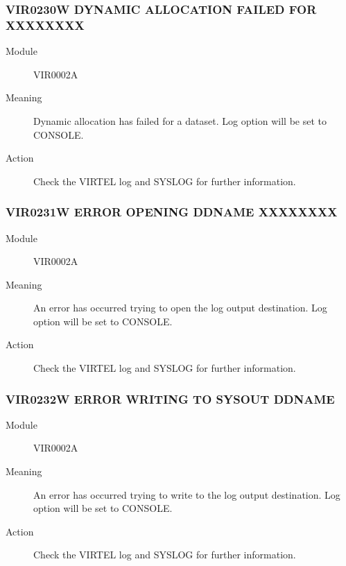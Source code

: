 \documentclass[letterpaper,10pt,english]{sphinxmanual}
\begin{document}
\subsubsection{VIR0230W DYNAMIC ALLOCATION FAILED FOR XXXXXXXX}
\label{\detokenize{messages:vir0230w-dynamic-allocation-failed-for-xxxxxxxx}}\begin{description}
\item[{Module}] \leavevmode
VIR0002A

\item[{Meaning}] \leavevmode
Dynamic allocation has failed for a dataset. Log option will be set to CONSOLE.

\item[{Action}] \leavevmode
Check the VIRTEL log and SYSLOG for further information.

\end{description}


\subsubsection{VIR0231W ERROR OPENING DDNAME XXXXXXXX}
\label{\detokenize{messages:vir0231w-error-opening-ddname-xxxxxxxx}}\begin{description}
\item[{Module}] \leavevmode
VIR0002A

\item[{Meaning}] \leavevmode
An error has occurred trying to open the log output destination. Log option will be set to CONSOLE.

\item[{Action}] \leavevmode
Check the VIRTEL log and SYSLOG for further information.

\end{description}


\subsubsection{VIR0232W ERROR WRITING TO SYSOUT DDNAME}
\label{\detokenize{messages:vir0232w-error-writing-to-sysout-ddname}}\begin{description}
\item[{Module}] \leavevmode
VIR0002A

\item[{Meaning}] \leavevmode
An error has occurred trying to write to the log output destination. Log option will be set to CONSOLE.

\item[{Action}] \leavevmode
Check the VIRTEL log and SYSLOG for further information.

\end{description}
\end{document}
